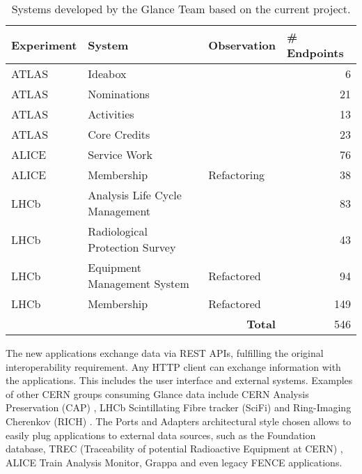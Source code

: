 \begin{table}[htbp]
\begin{tabular}{ll|l|r|}
\hline
\multicolumn{1}{|l|}{Experiment} & System & Observation & \multicolumn{1}{l|}{\# Endpoints} \\
\hline
\multicolumn{1}{|l|}{ATLAS}      & Ideabox \cite{oliveira-tcc}    &             & 6   \\ 
\multicolumn{1}{|l|}{ATLAS}      & Nominations \cite{oliveira-tcc} &             & 21  \\ 
\multicolumn{1}{|l|}{ATLAS}      & Activities                     &             & 13  \\ 
\multicolumn{1}{|l|}{ATLAS}      & Core Credits \cite{pires-tcc}  &             & 23  \\ 
\multicolumn{1}{|l|}{ALICE}      & Service Work                   &             & 76  \\ 
\multicolumn{1}{|l|}{ALICE}      & Membership                     & Refactoring & 38  \\ 
\multicolumn{1}{|l|}{LHCb}       & Analysis Life Cycle Management &             & 83  \\ 
\multicolumn{1}{|l|}{LHCb}       & Radiological Protection Survey &             & 43  \\ 
\multicolumn{1}{|l|}{LHCb}       & Equipment Management System \cite{de-jesus-tcc} & Refactored  & 94  \\ 
\multicolumn{1}{|l|}{LHCb}       & Membership                     & Refactored  & 149 \\
\hline
                                 &                                & \multicolumn{1}{r|}{\textbf{Total}} & 546 \\
\cline{3-4} 
\end{tabular}
\caption{Systems developed by the Glance Team based on the current project.}
\label{table:new-apps}
\end{table}

The new applications exchange data via REST APIs, fulfilling the original interoperability requirement. Any HTTP client can exchange information with the applications. This includes the user interface and external systems. Examples of other CERN groups consuming Glance data include CERN Analysis Preservation (CAP) \cite{cap-website}, LHCb Scintillating Fibre tracker (SciFi) \cite{lhcb-scifi} and Ring-Imaging Cherenkov (RICH) \cite{lhcb-rich}. The Ports and Adapters architectural style chosen allows to easily plug applications to external data sources, such as the Foundation database, TREC (Traceability of potential Radioactive Equipment at CERN) \cite{eam-trec-website}, ALICE Train Analysis Monitor, Grappa \cite{grappa-website} and even legacy FENCE applications.

